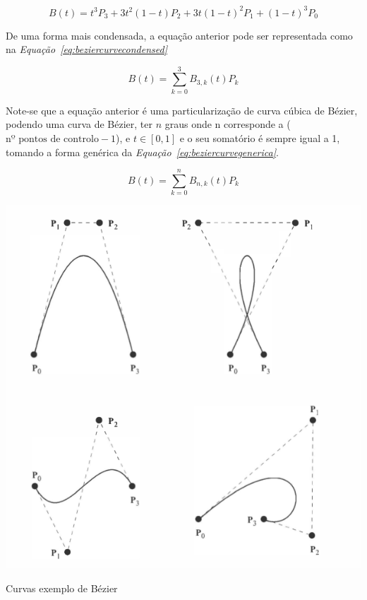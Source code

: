 \begin{equation}
B(t)=t^{3}P_{3}+3t^{2}(1-t)P_{2}+3t{(1-t)}^{2}P_{1}+{(1-t)}^{3}P_{0}
\label{eq:beziercurve}
\end{equation}

De uma forma mais condensada, a equação anterior pode ser representada como na
\emph{Equação~\ref{eq:beziercurvecondensed}} 


\begin{equation}
B(t)=\sum_{k=0}^{3}B_{3,k}(t)P_{k}
\label{eq:beziercurvecondensed}
\end{equation}


Note-se que a equação anterior é uma particularização de curva cúbica de Bézier,
podendo uma curva de Bézier, ter $n$ graus  onde n corresponde a ($\text{nº
pontos de controlo} - 1$), e $t \in [0,1]$ e o seu somatório é sempre igual a 1,
tomando a forma genérica da \emph{Equação~\ref{eq:beziercurvegenerica}}. 


\begin{equation}
B(t)=\sum_{k=0}^{n}B_{n,k}(t)P_{k}
\label{eq:beziercurvegenerica}
\end{equation}

\begin{center}
 	
 	\includegraphics[scale=0.5,keepaspectratio]{resources/exemplos1Bezier.png}
 	\captionsetup{type=figure, width=0.8\linewidth}
	\caption{Curvas exemplo de Bézier}
\label{fig:beziercubicexamples} 
\end{center}


